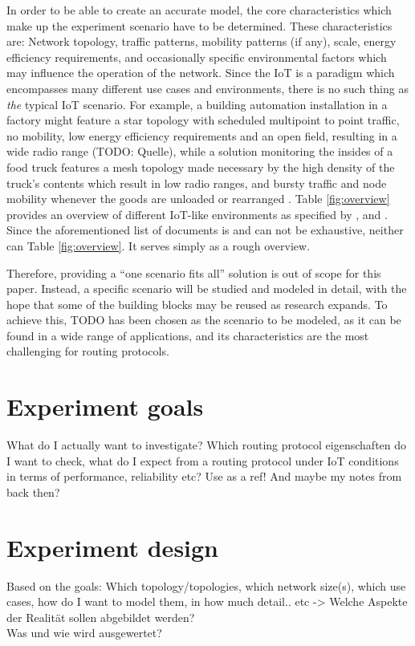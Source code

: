 \documentclass{acm_proc_article-sp}
\begin{document}
In order to be able to create an accurate model, the core characteristics which make up the experiment scenario have to be determined. These characteristics are: Network topology, traffic patterns, mobility patterns (if any), scale, energy efficiency requirements, and occasionally specific environmental factors which may influence the operation of the network.
Since the IoT is a paradigm which encompasses many different use cases and environments, there is no such thing as \emph{the} typical IoT scenario. For example, a building automation installation in a factory might feature a star topology with scheduled multipoint to point traffic, no mobility, low energy efficiency requirements and an open field, resulting in a wide radio range (TODO: Quelle), while a solution monitoring the insides of a food truck features a mesh topology made necessary by the high density of the truck's contents which result in low radio ranges, and bursty traffic and node mobility whenever the goods are unloaded or rearranged \cite{food_monitoring}.
Table \ref{fig:overview} provides an overview of different IoT-like environments as specified by \cite{RFC-5826}, \cite{RFC-5867} and \cite{RFC-5548}. Since the aforementioned list of documents is and can not be exhaustive, neither can Table \ref{fig:overview}. It serves simply as a rough overview.

Therefore, providing a ``one scenario fits all'' solution is out of scope for this paper. Instead, a specific scenario will be studied and modeled in detail, with the hope that some of the building blocks may be reused as research expands.
To achieve this, TODO has been chosen as the scenario to be modeled, as it can be found in a wide range of applications, and its characteristics are the most challenging for routing protocols.

\section{Experiment goals}
\label{sec:Goals}
What do I actually want to investigate? Which routing protocol eigenschaften do I want to check, what do I expect from a routing protocol under IoT conditions in terms of performance, reliability etc?
Use \cite{RFC-2501} as a ref! And maybe my notes from back then?

\section{Experiment design}
\label{sec:Design}
Based on the goals: Which topology/topologies, which network size(s), which use cases, how do I want to model them, in how much detail.. etc -> Welche Aspekte der Realität sollen abgebildet werden?\\
Was und wie wird ausgewertet?
\end{document}
